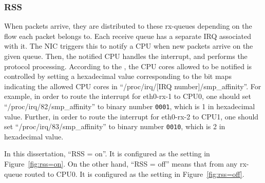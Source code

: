\subsubsection{RSS}

When packets arrive, they are distributed to these rx-queues depending on the flow each packet belongs to.
Each receive queue has a separate IRQ associated with it. The NIC triggers
this to notify a CPU when new packets arrive on the given queue.
Then, the notified CPU handles the interrupt, and performs the protocol processing. 
According to the \cite{TomHerbert}, the CPU cores allowed to be notified is controlled by setting a hexadecimal value corresponding to the bit maps indicating the allowed CPU cores in \enquote{/proc/irq/[IRQ number]/smp\_affinity}.
%
For example, in order to route the interrupt for eth0-rx-1 to CPU0, one should set \enquote{/proc/irq/82/smp\_affinity} to binary number {\tt 0001}, which is 1 in hexadecimal value.
Further, in order to route the interrupt for eth0-rx-2 to CPU1, one should set \enquote{/proc/irq/83/smp\_affinity} to binary number {\tt 0010}, which is 2 in hexadecimal value.

In this dissertation,
 \enquote{RSS = on}.
It is configured as the setting in Figure~\ref{fig:rss=on}.
%
On the other hand, \enquote{RSS = off} means that  from any rx-queue  routed to CPU0. 
It is configured as the setting in Figure~\ref{fig:rss=off}.

